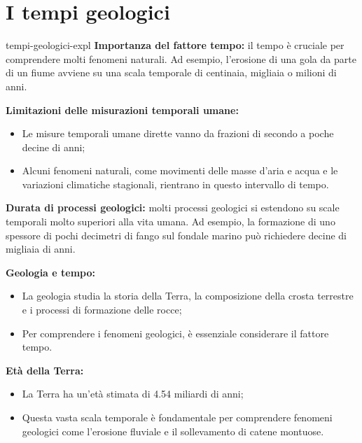 \documentclass[preview]{standalone}
\begin{document}
\genpage

\section{I tempi geologici}

\begin{snippet}{tempi-geologici-expl}
    \textbf{Importanza del fattore tempo:}
    il tempo è cruciale per comprendere molti fenomeni naturali. Ad esempio, l'erosione di una gola
    da parte di un fiume avviene su una scala temporale di centinaia, migliaia o milioni di anni.
    
    \textbf{Limitazioni delle misurazioni temporali umane:}
    \begin{itemize}
        \item Le misure temporali umane dirette vanno da frazioni di secondo a poche decine di anni;
        \item Alcuni fenomeni naturali, come movimenti delle masse d'aria e acqua e le variazioni
            climatiche stagionali, rientrano in questo intervallo di tempo.
    \end{itemize}
    
    \textbf{Durata di processi geologici:}
    molti processi geologici si estendono su scale temporali molto superiori alla vita umana.
    Ad esempio, la formazione di uno spessore di pochi decimetri di fango sul fondale marino può
    richiedere decine di migliaia di anni.
    
    \textbf{Geologia e tempo:}
    \begin{itemize}
        \item La geologia studia la storia della Terra, la composizione della crosta terrestre e i
            processi di formazione delle rocce;
        \item Per comprendere i fenomeni geologici, è essenziale considerare il fattore tempo.
    \end{itemize}
    
    \textbf{Età della Terra:}
    \begin{itemize}
        \item La Terra ha un'età stimata di 4.54 miliardi di anni;
        \item Questa vasta scala temporale è fondamentale per comprendere fenomeni geologici come
            l'erosione fluviale e il sollevamento di catene montuose.
    \end{itemize}
\end{snippet}
\end{document}
